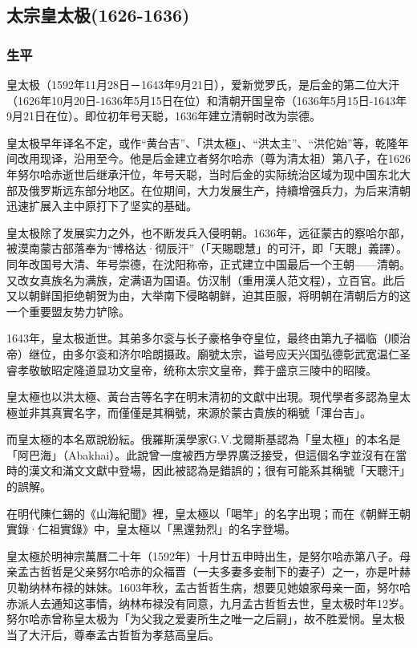 \subsection{太宗皇太极\tiny(1626-1636)}

\subsubsection{生平}

皇太极（1592年11月28日－1643年9月21日），爱新觉罗氏，是后金的第二位大汗（1626年10月20日-1636年5月15日在位）和清朝开国皇帝（1636年5月15日-1643年9月21日在位）。即位初年号天聪，1636年建立清朝时改为崇德。

皇太极早年译名不定，或作“黄台吉”、「洪太極」、“洪太主”、“洪佗始”等，乾隆年间改用现译，沿用至今。他是后金建立者努尔哈赤（尊为清太祖）第八子，在1626年努尔哈赤逝世后继承汗位，年号天聪，当时后金的实际统治区域为现中国东北大部及俄罗斯远东部分地区。在位期间，大力发展生产，持續增强兵力，为后来清朝迅速扩展入主中原打下了坚实的基础。

皇太极除了发展实力之外，也不断发兵入侵明朝。1636年，远征蒙古的察哈尔部，被漠南蒙古部落奉为“博格达·彻辰汗”（「天賜聰慧」的可汗，即「天聰」義譯）。同年改国号大清、年号崇德，在沈阳称帝，正式建立中国最后一个王朝——清朝。又改女真族名为满族，定满语为国语。仿汉制（重用漢人范文程），立百官。此后又以朝鲜国拒绝朝贺为由，大举南下侵略朝鲜，迫其臣服，将明朝在清朝后方的这一个重要盟友势力铲除。

1643年，皇太极逝世。其弟多尔衮与长子豪格争夺皇位，最终由第九子福临（顺治帝）继位，由多尔衮和济尔哈朗摄政。廟號太宗，谥号应天兴国弘德彰武宽温仁圣睿孝敬敏昭定隆道显功文皇帝，统称太宗文皇帝，葬于盛京三陵中的昭陵。

皇太極也以洪太極、黃台吉等名字在明末清初的文獻中出現。現代學者多認為皇太極並非其真實名字，而僅僅是其稱號，來源於蒙古貴族的稱號「渾台吉」。

而皇太極的本名眾說紛紜。俄羅斯漢學家G.V.戈爾斯基認為「皇太極」的本名是「阿巴海」（Abakhai）。此說曾一度被西方學界廣泛接受，但這個名字並沒有在當時的漢文和滿文文獻中登場，因此被認為是錯誤的；很有可能系其稱號「天聰汗」的誤解。

在明代陳仁錫的《山海紀聞》裡，皇太極以「喝竿」的名字出現；而在《朝鮮王朝實錄·仁祖實錄》中，皇太極以「黑還勃烈」的名字登場。

皇太極於明神宗萬曆二十年（1592年）十月廿五申時出生，是努尔哈赤第八子。母亲孟古哲哲是父亲努尔哈赤的众福晋（一夫多妻多妾制下的妻子）之一，亦是叶赫贝勒纳林布禄的妹妹。1603年秋，孟古哲哲生病，想要见她娘家母亲一面，努尔哈赤派人去通知这事情，纳林布禄没有同意，九月孟古哲哲去世，皇太极时年12岁。努尔哈赤曾称皇太极为「为父我之爱妻所生之唯一之后嗣」，故不胜爱悯。皇太极当了大汗后，尊奉孟古哲哲为孝慈高皇后。


